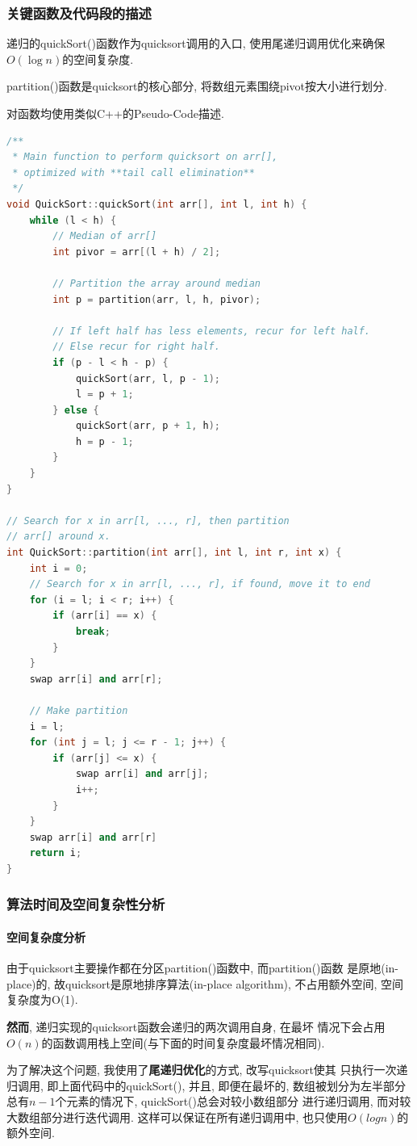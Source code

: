 \subsubsection{关键函数及代码段的描述}
递归的quickSort()函数作为quicksort调用的入口, 使用尾递归调用优化来确保
$O(\log{n})$的空间复杂度.\par
partition()函数是quicksort的核心部分, 将数组元素围绕pivot按大小进行划分.\par
对函数均使用类似C++的Pseudo-Code描述.
\begin{lstlisting}[language=c++]
/**
 * Main function to perform quicksort on arr[],
 * optimized with **tail call elimination**
 */
void QuickSort::quickSort(int arr[], int l, int h) {
    while (l < h) {
        // Median of arr[]
        int pivor = arr[(l + h) / 2];

        // Partition the array around median
        int p = partition(arr, l, h, pivor);

        // If left half has less elements, recur for left half.
        // Else recur for right half.
        if (p - l < h - p) {
            quickSort(arr, l, p - 1);
            l = p + 1;
        } else {
            quickSort(arr, p + 1, h);
            h = p - 1;
        }
    }
}

// Search for x in arr[l, ..., r], then partition
// arr[] around x.
int QuickSort::partition(int arr[], int l, int r, int x) {
    int i = 0;
    // Search for x in arr[l, ..., r], if found, move it to end
    for (i = l; i < r; i++) {
        if (arr[i] == x) {
            break;
        }
    }
    swap arr[i] and arr[r];

    // Make partition
    i = l;
    for (int j = l; j <= r - 1; j++) {
        if (arr[j] <= x) {
            swap arr[i] and arr[j];
            i++;
        }
    }
    swap arr[i] and arr[r]
    return i;
}
\end{lstlisting}

\subsubsection{算法时间及空间复杂性分析}
\paragraph{空间复杂度分析}
由于quicksort主要操作都在分区partition()函数中, 而partition()函数
是原地(in-place)的, 故quicksort是原地排序算法(in-place algorithm),
不占用额外空间, 空间复杂度为O(1).\par
\textbf{然而}, 递归实现的quicksort函数会递归的两次调用自身, 在最坏
情况下会占用$O(n)$的函数调用栈上空间(与下面的时间复杂度最坏情况相同).\par
为了解决这个问题, 我使用了\textbf{尾递归优化}的方式, 改写quicksort使其
只执行一次递归调用, 即上面代码中的quickSort(), 并且, 即便在最坏的,
数组被划分为左半部分总有$n-1$个元素的情况下, quickSort()总会对较小数组部分
进行递归调用, 而对较大数组部分进行迭代调用. 这样可以保证在所有递归调用中,
也只使用$O(log{n})$的额外空间.

